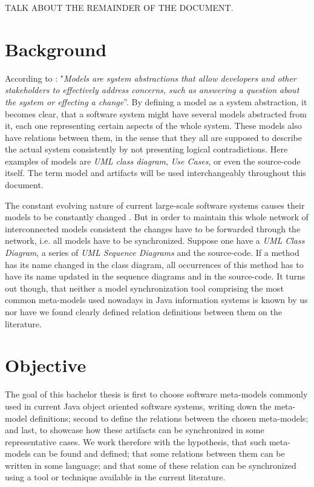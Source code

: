 \documentclass[tuberlin,cic,tc,english,noabntcite]{iiufrgs}
\begin{document}
TALK ABOUT THE REMAINDER OF THE DOCUMENT.

\section{Background}
According to \citet[p. 21]{czarnecki2006feature}: "\textit{Models are system abstractions that allow developers and other stakeholders to effectively address concerns, such as answering a question about the system or effecting a change}”. By defining a model as a system abstraction, it becomes clear, that a software system might have several models abstracted from it, each one representing certain aspects of the whole system. These models also have relations between them, in the sense that they all are supposed to describe the actual system consistently by not presenting logical contradictions. Here examples of models are \emph{UML class diagram}, \emph{Use Cases}, or even the source-code itself. The term model and artifacts will be used interchangeably throughout this document.

The constant evolving nature of current large-scale software systems causes their models to be constantly changed \cite{diskin2011model}. But in order to maintain this whole network of interconnected models consistent the changes have to be forwarded through the network, i.e. all models have to be synchronized. Suppose one have a \emph{UML Class Diagram}, a series of \emph{UML Sequence Diagrams} and the source-code. If a method has its name changed in the class diagram, all occurrences of this method has to have its name updated in the sequence diagrams and in the source-code. It turns out though, that neither a model synchronization tool comprising the most common meta-models used nowadays in Java information systems is known by us nor have we found clearly defined relation definitions between them on the literature. 

\section{Objective}
The goal of this bachelor thesis is first to choose software meta-models commonly used in current Java object oriented software systems, writing down the meta-model definitions; second to define the relations between the chosen meta-models; and last, to showcase how these artifacts can be synchronized in some representative cases. We work therefore with the hypothesis, that such meta-models can be found and defined; that some relations between them can be written in some language; and that some of these relation can be synchronized using a tool or technique available in the current literature.
\end{document}
